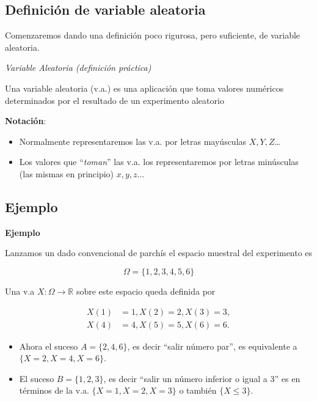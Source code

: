 \documentclass[]{book}
\providecommand{\tightlist}{%
  \setlength{\itemsep}{0pt}\setlength{\parskip}{0pt}}
\begin{document}
\hypertarget{definiciuxf3n-de-variable-aleatoria}{%
\subsection{Definición de variable aleatoria}\label{definiciuxf3n-de-variable-aleatoria}}

Comenzaremos dando una definición poco rigurosa, pero suficiente, de variable aleatoria.

 \emph{Variable Aleatoria (definición práctica)}

Una variable aleatoria (v.a.) es una aplicación que toma valores numéricos determinados por el resultado de un experimento aleatorio

\textbf{Notación}:

\begin{itemize}
\tightlist
\item
  Normalmente representaremos las v.a. por letras mayúsculas \(X,Y,Z\)\ldots
\item
  Los valores que ``\emph{toman}'' las v.a. los representaremos por letras minúsculas (las mismas en principio) \(x,y,z\ldots\)
\end{itemize}

\hypertarget{ejemplo-2}{%
\subsection{Ejemplo}\label{ejemplo-2}}

\textbf{Ejemplo}

Lanzamos un dado convencional de parchís el espacio muestral del experimento es

\[\Omega=\{1,2, 3, 4,  5, 6\}\]

Una v.a \(X:\Omega\to\mathbb{R}\)
sobre este espacio queda definida por

\[\begin{equation*}
\begin{split}
X(1)&=1,X(2)=2,X(3)=3,\\
X(4)&=4,X(5)=5,X(6)=6.
\end{split}
\end{equation*}\]

\begin{itemize}
\tightlist
\item
  Ahora el suceso \(A=\{2, 4, 6\}\), es decir ``salir
  número par'', es equivalente a \(\{X=2,X=4,X=6\}\).
\item
  El suceso \(B=\{1,2,3\}\), es decir ``salir un número
  inferior o igual a \(3\)'' es en términos de la v.a. \(\{X=1,X=2,X=3\}\) o también \(\{X\leq 3\}\).
\end{itemize}
\end{document}
